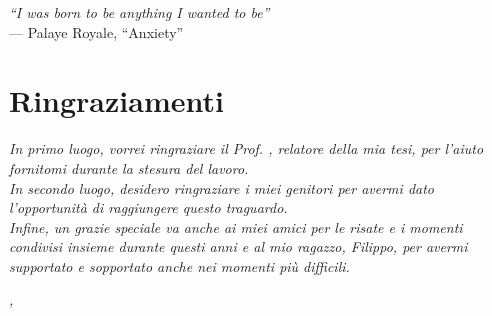 \cleardoublepage
{}
{}

\begin{flushright}{
    \slshape
    ``I was born to be anything I wanted to be''} \\
    \medskip
    --- Palaye Royale, ``Anxiety''
\end{flushright}


\bigskip

\begingroup
\let\clearpage\relax
\let\cleardoublepage\relax
\let\cleardoublepage\relax

\chapter*{Ringraziamenti}

\noindent \textit{In primo luogo, vorrei ringraziare il Prof. \myProf, relatore della mia tesi, per l'aiuto fornitomi durante la stesura del lavoro.}\\

\noindent \textit{In secondo luogo, desidero ringraziare i miei genitori per avermi dato l'opportunità di raggiungere questo traguardo.}\\

\noindent \textit{Infine, un grazie speciale va anche ai miei amici per le risate e i momenti condivisi insieme durante questi anni e al mio ragazzo, Filippo, per avermi supportato e sopportato anche nei momenti più difficili.}\\

\bigskip


\noindent\textit{\myLocation, \myTime}
\hfill \myName

\endgroup
